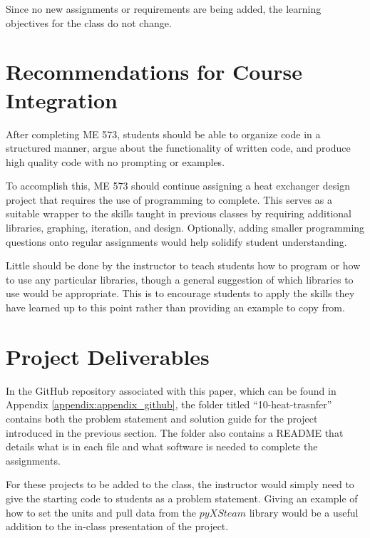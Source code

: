 Since no new assignments or requirements are being added, the learning objectives
for the class do not change. 

\section{Recommendations for Course Integration}

After completing ME 573, students should be able to organize code in a structured manner, 
argue about the functionality of written code, and produce high quality code with no prompting
or examples.

To accomplish this, ME 573 should continue assigning a heat exchanger design project that 
requires the use of programming to complete. This serves as a suitable wrapper to the skills
taught in previous classes by requiring additional libraries, graphing, iteration, and design.
Optionally, adding smaller programming questions onto regular assignments would help solidify
student understanding. 

Little should be done by the instructor to teach students how to program or how to use any
particular libraries, though a general suggestion of which libraries to use would be appropriate.
This is to encourage students to apply the skills they have learned up to this point rather than
providing an example to copy from. 

\section{Project Deliverables}

In the GitHub repository associated with this paper, which can be found in 
Appendix \ref{appendix:appendix_github}, the folder titled ``10-heat-trasnfer''
contains both the problem statement and solution guide for the project introduced in 
the previous section. The folder also contains a README that details what is in each file and 
what software is needed to complete the assignments. 

For these projects to be added to the class, the instructor would simply need to give the 
starting code to students as a problem statement. Giving an example of how to set the units
and pull data from the $pyXSteam$ library would be a useful addition to the in-class presentation
of the project.
